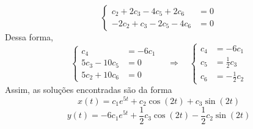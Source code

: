 \documentclass[oneside,12pt,a4paper]{report}
\begin{document}
\begin{resolucao}
\[\begin{cases}
            c_2+2c_3-4c_5+2c_6&=0\\
            -2c_2+c_3-2c_5-4c_6&=0
        \end{cases}\]
        Dessa forma,
        \[\begin{cases}
            c_4&=-6c_1\\
            5c_3-10c_5&=0\\
            5c_2+10c_6&=0
        \end{cases}\quad\Rightarrow\quad\begin{cases}
            c_4&=-6c_1\\
            c_5&=\frac{1}{2}c_3\\
            c_6&=-\frac{1}{2}c_2
        \end{cases}\]
        Assim, as soluções encontradas são da forma
        \[\boxed{x(t)=c_1e^{5t}+c_2\cos(2t)+c_3\sin(2t)}\]
        \[\boxed{y(t)=-6c_1e^{5t}+\frac{1}{2}c_3\cos(2t)-\frac{1}{2}c_2\sin(2t)}\]


\end{resolucao}
\end{document}

